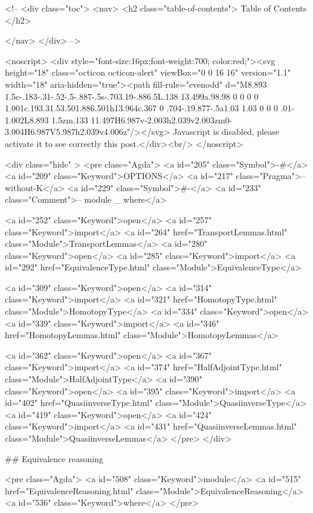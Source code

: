   <!-- 
  <div class="toc">
    <nav>
    <h2 class="table-of-contents"> Table of Contents </h2>
      

    </nav>
  </div>
   -->

  <noscript>
  <div style="font-size:16px;font-weight:700; color:red;"><svg height="18" class="octicon octicon-alert" viewBox="0 0 16 16" version="1.1" width="18" aria-hidden="true"><path fill-rule="evenodd" d="M8.893 1.5c-.183-.31-.52-.5-.887-.5s-.703.19-.886.5L.138 13.499a.98.98 0 0 0 0 1.001c.193.31.53.501.886.501h13.964c.367 0 .704-.19.877-.5a1.03 1.03 0 0 0 .01-1.002L8.893 1.5zm.133 11.497H6.987v-2.003h2.039v2.003zm0-3.004H6.987V5.987h2.039v4.006z"/></svg> Javascript is disabled, please activate it to see correctly this post.</div><br/>
  </noscript>

  <div class="hide" >
<pre class="Agda">
<a id="205" class="Symbol">{-#</a> <a id="209" class="Keyword">OPTIONS</a> <a id="217" class="Pragma">--without-K</a> <a id="229" class="Symbol">#-}</a>
<a id="233" class="Comment">-- module _ where</a>

<a id="252" class="Keyword">open</a> <a id="257" class="Keyword">import</a> <a id="264" href="TransportLemmas.html" class="Module">TransportLemmas</a>
<a id="280" class="Keyword">open</a> <a id="285" class="Keyword">import</a> <a id="292" href="EquivalenceType.html" class="Module">EquivalenceType</a>

<a id="309" class="Keyword">open</a> <a id="314" class="Keyword">import</a> <a id="321" href="HomotopyType.html" class="Module">HomotopyType</a>
<a id="334" class="Keyword">open</a> <a id="339" class="Keyword">import</a> <a id="346" href="HomotopyLemmas.html" class="Module">HomotopyLemmas</a>

<a id="362" class="Keyword">open</a> <a id="367" class="Keyword">import</a> <a id="374" href="HalfAdjointType.html" class="Module">HalfAdjointType</a>
<a id="390" class="Keyword">open</a> <a id="395" class="Keyword">import</a> <a id="402" href="QuasiinverseType.html" class="Module">QuasiinverseType</a>
<a id="419" class="Keyword">open</a> <a id="424" class="Keyword">import</a> <a id="431" href="QuasiinverseLemmas.html" class="Module">QuasiinverseLemmas</a>
</pre>
</div>

## Equivalence reasoning

<pre class="Agda">
<a id="508" class="Keyword">module</a> <a id="515" href="EquivalenceReasoning.html" class="Module">EquivalenceReasoning</a> <a id="536" class="Keyword">where</a>
</pre>

